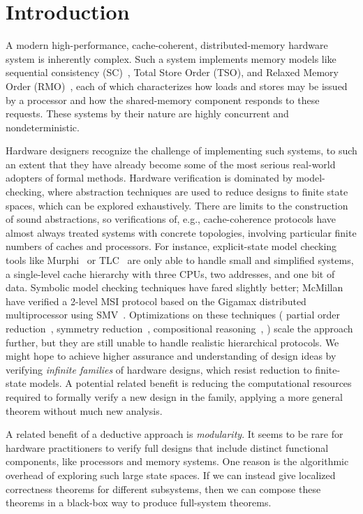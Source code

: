 \section{Introduction}
\label{sec:Introduction}

A modern high-performance, cache-coherent, distributed-memory hardware system is
inherently complex. Such a system implements memory models like sequential
consistency (SC)~\cite{lamport1979make}, Total Store Order (TSO), and
Relaxed Memory Order (RMO)~\cite{weaver1994sparc}, each
of which characterizes how loads and stores may be issued by a processor and
how the shared-memory component responds to these requests.  These systems by
their nature are highly concurrent and nondeterministic.

Hardware designers recognize the challenge of implementing such systems, to such an extent that they have
already become some of the most serious real-world adopters of formal methods.
Hardware verification is dominated by model-checking, where abstraction
techniques are used to reduce designs to finite state spaces, which can be
explored exhaustively.  There are limits to the construction of sound
abstractions, so verifications of, e.g., cache-coherence protocols have almost
always treated systems with concrete topologies, involving particular finite
numbers of caches and processors. For instance, explicit-state model checking tools
like Murphi~\cite{murphi} or TLC~\cite{tlc} are only able to handle small and
simplified systems, \eg{} a single-level cache hierarchy with three CPUs, two
addresses, and one bit of data. Symbolic model checking techniques have fared
slightly better; McMillan \etal{} have verified a 2-level MSI protocol based on
the Gigamax distributed multiprocessor using SMV~\cite{gigamax}. Optimizations
on these techniques (\eg{} partial order reduction~\cite{part}, symmetry
reduction~\cite{sym1, sym2}, compositional reasoning~\cite{comp}, \etc{}) scale
the approach further, but they are still unable to handle realistic
hierarchical protocols. We might hope to achieve higher
assurance and understanding of design ideas by verifying \emph{infinite families}
of hardware designs, which resist reduction to finite-state models.  A
potential related benefit is reducing the computational resources required
to formally verify a new design in the family, applying a more general theorem without
much new analysis. 

A related benefit of a deductive approach is \emph{modularity}.  It seems to
be rare for hardware practitioners to verify full designs that include
distinct functional components, like processors and memory systems.  One
reason is the algorithmic overhead of exploring such large state spaces.
If we can instead give localized correctness theorems for different
subsystems, then we can compose these theorems in a black-box way to
produce full-system theorems.

